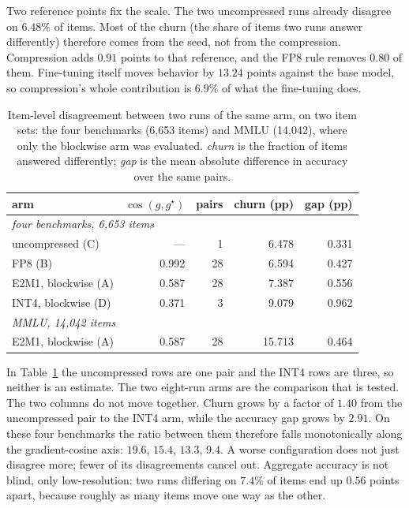 \documentclass[11pt,letterpaper]{article}
\begin{document}
Two reference points fix the scale. The two uncompressed runs already disagree on $6.48\%$ of items. Most of the churn (the share of items two runs answer differently) therefore comes from the seed, not from the compression. Compression adds $0.91$ points to that reference, and the FP8 rule removes $0.80$ of them. Fine-tuning itself moves behavior by $13.24$ points against the base model, so compression's whole contribution is $6.9\%$ of what the fine-tuning does.

\begin{table}[htbp]
\centering
\small
\caption{Item-level disagreement between two runs of the same arm, on two item sets: the four benchmarks (6{,}653 items) and MMLU (14{,}042), where only the blockwise arm was evaluated. \emph{churn} is the fraction of items answered differently; \emph{gap} is the mean absolute difference in accuracy over the same pairs.}
\label{tab:churn}
\begin{tabular}{lrrrr}
\toprule
arm & $\cos(g,g^\star)$ & pairs & churn (pp) & gap (pp) \\
\midrule
\multicolumn{5}{l}{\emph{four benchmarks, 6{,}653 items}} \\
uncompressed (C)    & ---    &  1 & 6.478 & 0.331 \\
FP8 (B)             & 0.992  & 28 & 6.594 & 0.427 \\
E2M1, blockwise (A) & 0.587  & 28 & 7.387 & 0.556 \\
INT4, blockwise (D) & 0.371  &  3 & 9.079 & 0.962 \\
\midrule
\multicolumn{5}{l}{\emph{MMLU, 14{,}042 items}} \\
E2M1, blockwise (A) & 0.587  & 28 & 15.713 & 0.464 \\
\bottomrule
\end{tabular}
\end{table}

In Table~\ref{tab:churn} the uncompressed rows are one pair and the INT4 rows are three, so neither is an estimate. The two eight-run arms are the comparison that is tested. The two columns do not move together. Churn grows by a factor of $1.40$ from the uncompressed pair to the INT4 arm, while the accuracy gap grows by $2.91$. On these four benchmarks the ratio between them therefore falls monotonically along the gradient-cosine axis: $19.6$, $15.4$, $13.3$, $9.4$. A worse configuration does not just disagree more; fewer of its disagreements cancel out. Aggregate accuracy is not blind, only low-resolution: two runs differing on $7.4\%$ of items end up $0.56$ points apart, because roughly as many items move one way as the other.
\end{document}
